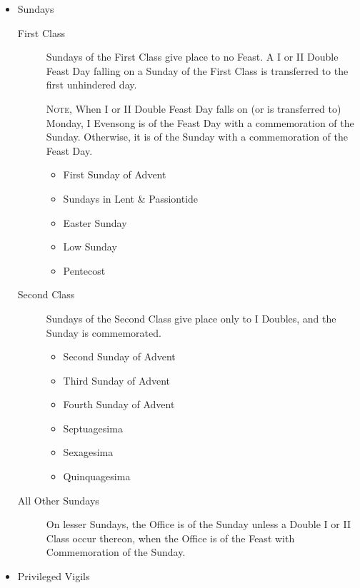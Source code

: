 \begin{itemize}
\begin{itemize}
\begin{itemize}
                \end{itemize}
        \end{itemize}
    \item Sundays
        \begin{description}
            \item[First Class] Sundays of the First Class give place to no Feast. A I or II Double Feast Day falling on a Sunday of the First Class is transferred to the first unhindered day.\par
            \textsc{Note,} When I or II Double Feast Day falls on (or is transferred to) Monday, I Evensong is of the Feast Day with a commemoration of the Sunday. Otherwise, it is of the Sunday with a commemoration of the Feast Day.
                \begin{itemize}
                    \item First Sunday of Advent
                    \item Sundays in Lent \& Passiontide
                    \item Easter Sunday
                    \item Low Sunday
                    \item Pentecost
                \end{itemize}
            \item[Second Class] Sundays of the Second Class give place only to I Doubles, and the Sunday is commemorated.
                \begin{itemize}
                    \item Second Sunday of Advent
                    \item Third Sunday of Advent
                    \item Fourth Sunday of Advent
                    \item Septuagesima
                    \item Sexagesima
                    \item Quinquagesima
                \end{itemize}
            \item[All Other Sundays] On lesser Sundays, the Office is of the Sunday unless a Double I or II Class occur thereon, when the Office is of the Feast with Commemoration of the Sunday.
        \end{description}
    \item Privileged Vigils\par
        \begin{description}

\end{description}
\end{itemize}
